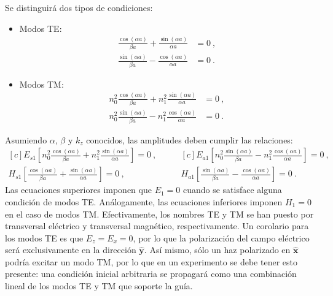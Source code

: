 Se distinguirá dos tipos de condiciones:
\begin{itemize}
	\item Modos TE:\begin{align}
	\frac{\cos(\alpha a)}{\beta a} + \frac{\sin(\alpha a)}{\alpha a}&= 0 \ , \label{eqn:TEsim}
	\\
	 \frac{\sin(\alpha a)}{\beta a} - \frac{\cos(\alpha a)}{\alpha a} &= 0 \ . \label{eqn:TEanti}
	\end{align}
	\item Modos TM:\begin{align}
	n_0^2 \frac{\cos(\alpha a)}{\beta a} + n_1^2\frac{\sin(\alpha a)}{\alpha a}  &= 0 \ , \label{eqn:TMsim}
	\\
	 n_0^2\frac{\sin(\alpha a)}{\beta a} - n_1^2\frac{\cos(\alpha a)}{\alpha a} &= 0 \ . \label{eqn:TManti}
	\end{align}
\end{itemize}
Asumiendo $\alpha$, $\beta$ y $k_z$ conocidos, las amplitudes deben cumplir las relaciones:
\begin{equation*}
	\begin{aligned}[c]
	E_{s1} \left[n_0^2 \frac{\cos(\alpha a)}{\beta a}+n_1 ^2 \frac{\sin(\alpha a)}{\alpha a}\right] = 0 \ ,
		\\
	H_{s1} \left[\frac{\cos(\alpha a)}{\beta a} + \frac{\sin(\alpha a)}{\alpha a} \right] = 0 \ ,
\end{aligned} 
\quad\quad
	\begin{aligned}[c]
	E_{a1} \left[ n_0^2\frac{\sin(\alpha a)}{\beta a} - n_1^2\frac{\cos(\alpha a)}{\alpha a}\right] = 0 \ ,
		\\
	H_{a1} \left[ \frac{\sin(\alpha a)}{\beta a} - \frac{\cos(\alpha a)}{\alpha a}\right] = 0 \ .
\end{aligned} 
\end{equation*}
Las ecuaciones superiores imponen que $E_1 = 0$ cuando se satisface alguna condición de modos TE. Análogamente, las ecuaciones inferiores imponen $H_1 = 0$ en el caso de modos TM. Efectivamente, los nombres TE y TM se han puesto por transversal eléctrico y transversal magnético, respectivamente.
Un corolario para los modos TE es que $E_z = E_x = 0$, por lo que la polarización del campo eléctrico será exclusivamente en la dirección $\hat{\textbf{y}}$. Así mismo, sólo un haz polarizado en $\hat{\textbf{x}}$ podría excitar un modo TM, por lo que en un experimento se debe tener esto presente: una condición inicial arbitraria se propagará como una combinación lineal de los modos TE y TM que soporte la guía.

